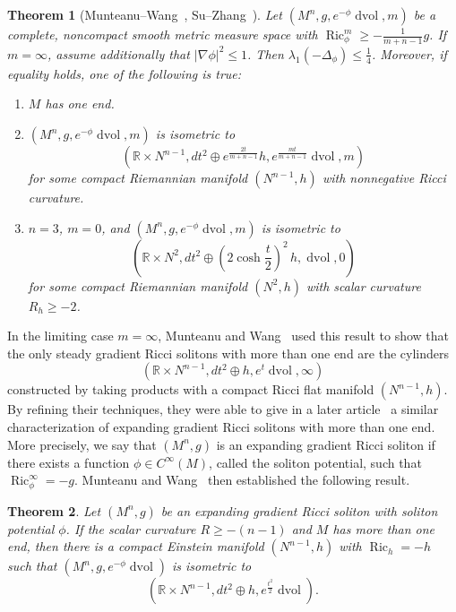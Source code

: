 \documentclass{amsart}
\newtheorem{thm}{Theorem}[section]
\theoremstyle{definition}
\theoremstyle{remark}
\numberwithin{equation}{section}
\begin{document}
\begin{thm}[Munteanu--Wang~\cite{MunteanuWang2011}, Su--Zhang~\cite{SuZhang2011}]
\label{thm:weighted_cheng}
Let $(M^n,g,e^{-\phi}\operatorname{dvol},m)$ be a complete, noncompact smooth metric measure space with $\operatorname{Ric}_\phi^m\geq-\frac{1}{m+n-1}g$.  If $m=\infty$, assume additionally that ${\lvert}\nabla\phi{\rvert}^2\leq 1$.  Then $\lambda_1(-\Delta_\phi)\leq\frac{1}{4}$.  Moreover, if equality holds, one of the following is true:
\begin{enumerate}
\item $M$ has one end.
\item $(M^n,g,e^{-\phi}\operatorname{dvol},m)$ is isometric to
\[ \left( {\mathbb{R}}\times N^{n-1}, dt^2\oplus e^{\frac{2t}{m+n-1}}h, e^{\frac{mt}{m+n-1}}\operatorname{dvol}, m \right) \]
for some compact Riemannian manifold $(N^{n-1},h)$ with nonnegative Ricci curvature.
\item $n=3$, $m=0$, and $(M^n,g,e^{-\phi}\operatorname{dvol},m)$ is isometric to
\[ ({\mathbb{R}}\times N^2,dt^2\oplus(2\cosh\frac{t}{2})^2\,h, \operatorname{dvol}, 0) \]
for some compact Riemannian manifold $(N^2,h)$ with scalar curvature $R_h\geq-2$.
\end{enumerate}
\end{thm}

In the limiting case $m=\infty$, Munteanu and Wang~\cite{MunteanuWang2011} used this result to show that the only steady gradient Ricci solitons with more than one end are the cylinders
\[ \left( {\mathbb{R}}\times N^{n-1}, dt^2\oplus h, e^t\operatorname{dvol}, \infty\right) \]
constructed by taking products with a compact Ricci flat manifold $(N^{n-1},h)$.  By refining their techniques, they were able to give in a later article~\cite{MunteanuWang2011b} a similar characterization of expanding gradient Ricci solitons with more than one end.  More precisely, we say that $(M^n,g)$ is an expanding gradient Ricci soliton if there exists a function $\phi\in C^\infty(M)$, called the soliton potential, such that $\operatorname{Ric}_\phi^\infty=-g$.  Munteanu and Wang~\cite{MunteanuWang2011b} then established the following result.

\begin{thm}
\label{thm:munteanu_wang2011b}
Let $(M^n,g)$ be an expanding gradient Ricci soliton with soliton potential $\phi$.  If the scalar curvature $R\geq-(n-1)$ and $M$ has more than one end, then there is a compact Einstein manifold $(N^{n-1},h)$ with $\operatorname{Ric}_h=-h$ such that $(M^n,g,e^{-\phi}\operatorname{dvol})$ is isometric to
\[ \left( {\mathbb{R}}\times N^{n-1}, dt^2\oplus h, e^{\frac{t^2}{2}}\operatorname{dvol} \right) . \]
\end{thm}
\end{document}
